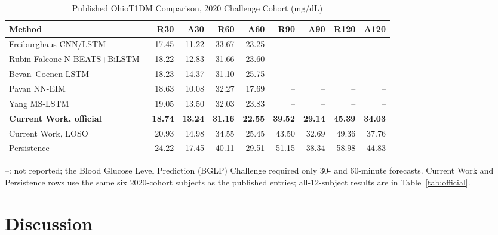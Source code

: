 \documentclass[journal]{IEEEtran}
\begin{document}
\begin{table}[t]
\centering
\caption{Published OhioT1DM Comparison, 2020 Challenge Cohort ($\mathrm{mg/dL}$)}
\label{tab:published}
\footnotesize
\begin{tabular}{lrrrrrrrr}
\toprule
Method & R30 & A30 & R60 & A60 & R90 & A90 & R120 & A120 \\
\midrule
Freiburghaus CNN/LSTM~\cite{ref63} & 17.45 & 11.22 & 33.67 & 23.25 & -- & -- & -- & -- \\
Rubin-Falcone N-BEATS+BiLSTM~\cite{ref62} & 18.22 & 12.83 & 31.66 & 23.60 & -- & -- & -- & -- \\
Bevan--Coenen LSTM~\cite{ref61} & 18.23 & 14.37 & 31.10 & 25.75 & -- & -- & -- & -- \\
Pavan NN-EIM~\cite{ref60} & 18.63 & 10.08 & 32.27 & 17.69 & -- & -- & -- & -- \\
Yang MS-LSTM~\cite{ref64} & 19.05 & 13.50 & 32.03 & 23.83 & -- & -- & -- & -- \\
\textbf{Current Work, official} & \textbf{18.74} & \textbf{13.24} & \textbf{31.16} & \textbf{22.55} & \textbf{39.52} & \textbf{29.14} & \textbf{45.39} & \textbf{34.03} \\
Current Work, LOSO & 20.93 & 14.98 & 34.55 & 25.45 & 43.50 & 32.69 & 49.36 & 37.76 \\
Persistence & 24.22 & 17.45 & 40.11 & 29.51 & 51.15 & 38.34 & 58.98 & 44.83 \\
\bottomrule
\end{tabular}

\vspace{2pt}
\raggedright\footnotesize
--: not reported; the Blood Glucose Level Prediction (BGLP) Challenge required only 30- and 60-minute forecasts. Current Work and Persistence rows use the same six 2020-cohort subjects as the published entries; all-12-subject results are in Table~\ref{tab:official}.
\end{table}




\section{Discussion}
\end{document}
